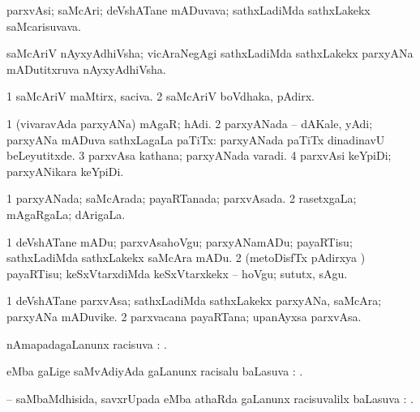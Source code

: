 \bentry
{}
\gl{\nA}
\bmng
parxvAsi; saMcAri; deVshATane mADuvava; sathxLadiMda sathxLakekx saMcarisuvava. 
\emng
\eentry

\bentry
{}
\gl{\nA}
\bmng
saMcAriV nAyxyAdhiVsha; vicAraNegAgi sathxLadiMda sathxLakekx parxyANa mADutitxruva nAyxyAdhiVsha. 
\emng
\eentry

\bentry
{}
\gl{\nA}
\bmng
\bnum
\num{1} saMcAriV maMtirx, saciva. 
\num{2} saMcAriV boVdhaka, pAdirx. 
\enum
\emng
\eentry

\bentry
{}
\gl{\nA}
\bmng
\bnum
\num{1} (vivaravAda parxyANa) mAgaR; hAdi. 
\num{2} parxyANada -- dAKale, yAdi; parxyANa mADuva sathxLagaLa paTiTx:  parxyANada paTiTx dinadinavU beLeyutitxde. 
\num{3} parxvAsa kathana; parxyANada varadi. 
\num{4} parxvAsi keYpiDi; parxyANikara keYpiDi. 
\enum
\emng
\eentry

\bentry
{}
\gl{\gu}
\bmng
\bnum
\num{1} parxyANada; saMcArada; payaRTanada; parxvAsada. 
\num{2} rasetxgaLa; mAgaRgaLa; dArigaLa. 
\enum
\emng
\eentry

\bentry
{}
\gl{\akirx}
\bmng
\bnum
\num{1} deVshATane mADu; parxvAsahoVgu; parxyANamADu; payaRTisu; sathxLadiMda sathxLakekx saMcAra mADu. 
\num{2} (metoDisfTx pAdirxya \vi) payaRTisu; keSxVtarxdiMda keSxVtarxkekx -- hoVgu; sututx, sAgu. 
\enum
\emng
\eentry

\bentry
{}
\gl{\nA}
\bmng
\bnum
\num{1} deVshATane parxvAsa; sathxLadiMda sathxLakekx parxyANa, saMcAra; parxyANa mADuvike. 
\num{2} parxvacana payaRTana; upanAyxsa parxvAsa. 
\enum
\emng
\eentry

\bentry
{}
\gl{\uparx}
\bmng
nAmapadagaLanunx racisuva \uparx: . 
\emng
\eentry

\bentry
{}
\gl{\uparx}
\bmng
{} eMba \nA gaLige saMvAdiyAda \gu gaLanunx racisalu baLasuva \uparx: . 
\emng
\eentry

\bentry
{}
\gl{\uparx}
\bmng
 -- saMbaMdhisida, savxrUpada eMba athaRda \gu gaLanunx racisuvalilx baLasuva \uparx: . 
\emng
\eentry

